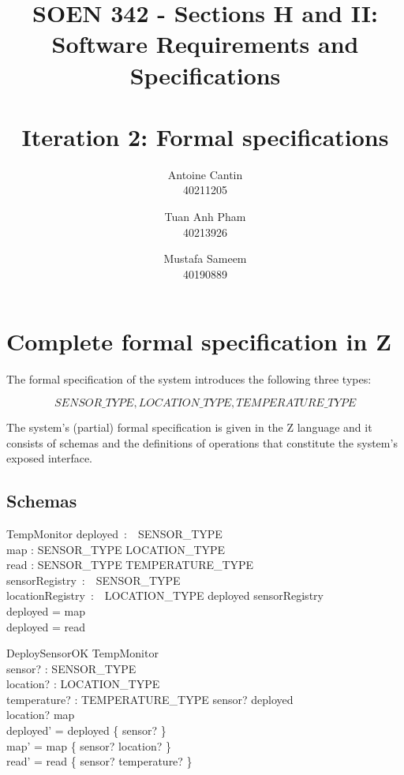 \documentclass[12pt]{article}
\title{SOEN 342 - Sections H and II:\\Software Requirements and Specifications\\
	\ \\
	Iteration 2: Formal specifications}
\author{Antoine Cantin \\ 40211205 \and Tuan Anh Pham \\ 40213926  \and Mustafa Sameem \\40190889}
\date{\displaydate{mydate}}
\begin{document}
		\maketitle
		
		\newpage

		\section{Complete formal specification in Z}
		
		The formal specification of the system introduces the following three types:
		
		\[ SENSOR\_TYPE, LOCATION\_TYPE, TEMPERATURE\_TYPE  \]
		
		\noindent The system's (partial) formal specification is given in the Z language and it consists of schemas and the definitions of operations that constitute the system's exposed interface.
		
	
		\subsection{Schemas}
		
		
		\begin{schema}{TempMonitor}
			deployed~:~~SENSOR\_TYPE\\
			map : SENSOR\_TYPE \nrightarrow LOCATION\_TYPE\\
			read : SENSOR\_TYPE  \nrightarrow TEMPERATURE\_TYPE\\
            sensorRegistry~:~~SENSOR\_TYPE\\
            locationRegistry~:~~LOCATION\_TYPE
			\where
            deployed \subseteq sensorRegistry\\
			deployed = \dom map\\
			deployed = \dom read
		\end{schema}
		
		
		
		\begin{schema}{DeploySensorOK}
			\Delta TempMonitor\\
			sensor? : SENSOR\_TYPE\\
			location? : LOCATION\_TYPE\\
			temperature? : TEMPERATURE\_TYPE
			\where
			sensor? \notin deployed\\
			location? \notin \ran map\\
			deployed' = deployed \cup \{ sensor? \}\\
			map' = map \cup \{ sensor? \mapsto location? \}\\
			read' = read \cup \{ sensor? \mapsto temperature? \}
		\end{schema}
		
\end{document}
